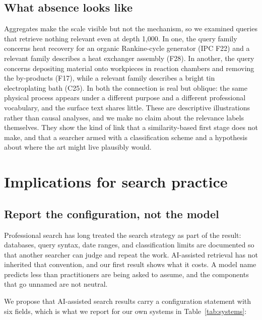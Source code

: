 \documentclass[preprint,11pt,authoryear]{elsarticle}          %
\begin{document}
\subsection{What absence looks like}

Aggregates make the scale visible but not the mechanism, so we examined queries that retrieve nothing relevant even at depth 1{,}000. In one, the query family concerns heat recovery for an organic Rankine-cycle generator (IPC F22) and a relevant family describes a heat exchanger assembly (F28). In another, the query concerns depositing material onto workpieces in reaction chambers and removing the by-products (F17), while a relevant family describes a bright tin electroplating bath (C25). In both the connection is real but oblique: the same physical process appears under a different purpose and a different professional vocabulary, and the surface text shares little. These are descriptive illustrations rather than causal analyses, and we make no claim about the relevance labels themselves. They show the kind of link that a similarity-based first stage does not make, and that a searcher armed with a classification scheme and a hypothesis about where the art might live plausibly would.

\section{Implications for search practice}
\label{sec:implications}

\subsection{Report the configuration, not the model}

Professional search has long treated the search strategy as part of the result: databases, query syntax, date ranges, and classification limits are documented so that another searcher can judge and repeat the work. AI-assisted retrieval has not inherited that convention, and our first result shows what it costs. A model name predicts less than practitioners are being asked to assume, and the components that go unnamed are not neutral.

We propose that AI-assisted search results carry a configuration statement with six fields, which is what we report for our own systems in Table~\ref{tab:systems}:
\end{document}
